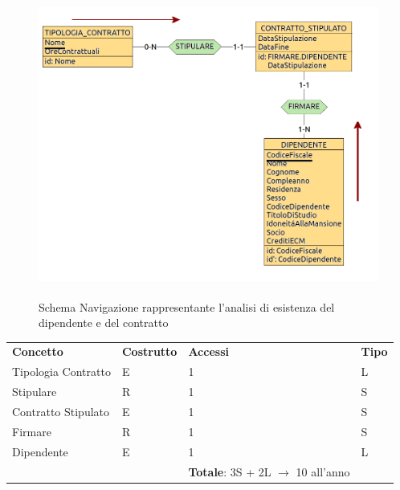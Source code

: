 \documentclass[a4paper, 12pt]{report}
\begin{document}
\begin{figure}[H]
        \centering
        \includegraphics[height=10cm]{img/OP9SchemaNavigazione.png}
        \caption{Schema Navigazione rappresentante l'analisi di esistenza del dipendente e del contratto}
\end{figure}

\bigskip
\noindent
\begin{tabularx}{\textwidth}{XlXl}
        \rowcolor{seaGreen}
        \textbf{Concetto} & \textbf{Costrutto} & \textbf{Accessi} & \textbf{Tipo} \\
        Tipologia Contratto & E & 1 & L \\
        \hline
        Stipulare & R & 1 & S \\
        \hline
        Contratto Stipulato & E & 1 & S \\
        \hline
        Firmare & R & 1 & S \\
        \hline
        Dipendente & E & 1 & L \\
        \rowcolor{seaGreen}
         &  & \textbf{Totale}: 3S + 2L $\rightarrow$ 10 all'anno & \\
\end{tabularx}
\end{document}
